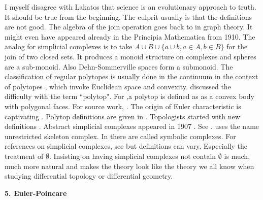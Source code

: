 \documentclass[12pt]{amsart}
\begin{document}
I myself disagree with Lakatos that science is an evolutionary approach to truth. It should
be true from the beginning. The culprit usually is that the definitions are
not good. The algebra of the join operation goes back to \cite{Zykov} in graph theory. It might even
have appeared already in the Principia Mathematica from 1910. 
The analog for simplicial complexes is to take $A \cup B \cup \{ a \cup b, a \in A, b \in B \}$ for
the join of two closed sets.  It
produces a monoid structure on complexes and spheres are a sub-monoid. Also Dehn-Sommerville spaces
form a submonoid.  The classification of regular polytopes is usually done in the continuum in the context of
polytopes \cite{cromwell,symmetries,Sutton,Ziegler,gruenbaum}, which invoke Euclidean space and convexity. \cite{Gruenbaum2003} discussed
the difficulty with the term ``polytop". 
For \cite{coxeter},a polytop is defined as as a convex body with polygonal faces. 
For source work, \cite{Schlafli,Schoute,AliciaBooleStott}. The origin of Euler characteristic is captivating
\cite{Aczel}. Polytop definitions are given in \cite{Schlafli,coxeter,gruenbaum,symmetries}. 
Topologists started with new definitions \cite{alexandroff,Fomenko,ConwayCapstone,Spanier}.
Abstract simplicial complexes appeared in 1907 \cite{DehnHeegaard}. See
\cite{BurdeZieschang,MunkholmMunkholm}. \cite{alexandroff} uses the name 
unrestricted skeleton complex. In \cite{Whitehead} there are called
symbolic complexes. For references on simplicial complexes, see 
\cite{JonssonSimplicial, Stanley86,Stanley1996} but definitions can vary. Especially the treatment 
of $\emptyset$. Insisting on having simplicial complexes not contain $\emptyset$ is much, much 
more natural and makes the theory look like the theory we all know when studying differential 
topology or differential geometry.  \\

{\bf 5. Euler-Poincare} \\
\end{document}
